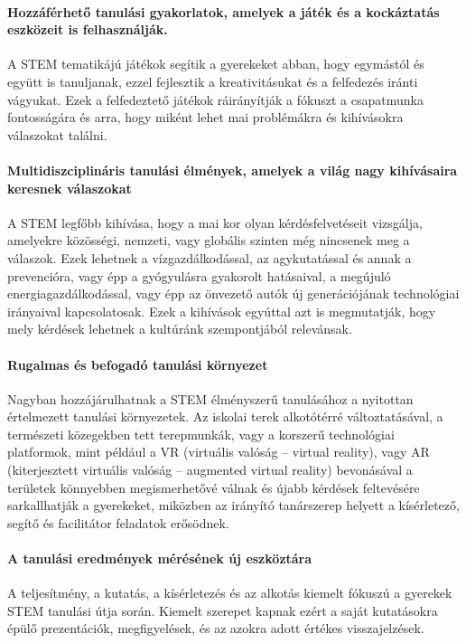 \paragraph{Hozzáférhető tanulási gyakorlatok, amelyek a játék és a kockáztatás
  eszközeit is felhasználják.} A STEM tematikájú játékok segítik a gyerekeket
abban, hogy egymástól és együtt is tanuljanak, ezzel fejlesztik a
kreativitásukat és a felfedezés iránti vágyukat. Ezek a felfedeztető játékok
ráirányítják a fókuszt a csapatmunka fontosságára és arra, hogy miként lehet
mai problémákra és kihívásokra válaszokat találni.

\paragraph{Multidiszciplináris tanulási élmények, amelyek a világ nagy
  kihívásaira keresnek válaszokat} A STEM legfőbb kihívása, hogy a mai kor olyan
kérdésfelvetéseit vizsgálja, amelyekre közösségi, nemzeti, vagy globális
szinten még nincsenek meg a válaszok. Ezek lehetnek a vízgazdálkodással, az
agykutatással és annak a prevencióra, vagy épp a gyógyulásra gyakorolt
hatásaival, a megújuló energiagazdálkodással, vagy épp az önvezető autók új
generációjának technológiai irányaival kapcsolatosak. Ezek a kihívások egyúttal
azt is megmutatják, hogy mely kérdések lehetnek a kultúránk szempontjából
relevánsak.

\paragraph{Rugalmas és befogadó tanulási környezet} Nagyban hozzájárulhatnak a
STEM élményszerű tanulásához a nyitottan értelmezett tanulási környezetek. Az
iskolai terek alkotótérré változtatásával, a természeti közegekben tett
terepmunkák, vagy a korszerű technológiai platformok, mint például a VR
(virtuális valóság – virtual reality), vagy AR (kiterjesztett virtuális valóság
– augmented virtual reality) bevonásával a területek könnyebben megismerhetővé
válnak és újabb kérdések feltevésére sarkallhatják a gyerekeket, miközben az
irányító tanárszerep helyett a kísérletező, segítő és facilitátor feladatok
erősödnek.

\paragraph{A tanulási eredmények mérésének új eszköztára} A teljesítmény, a
kutatás, a kísérletezés és az alkotás kiemelt fókuszú a gyerekek STEM tanulási
útja során. Kiemelt szerepet kapnak ezért a saját kutatásokra épülő
prezentációk, megfigyelések, és az azokra adott értékes visszajelzések.

